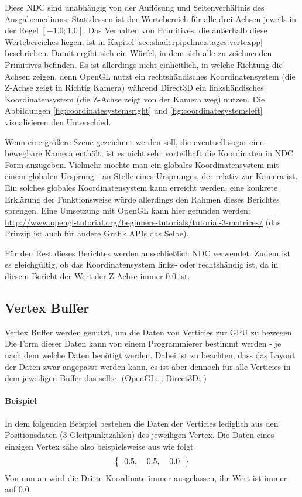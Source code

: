 Diese NDC sind unabhängig von der Auflösung und Seitenverhältnis des Ausgabemediums. Stattdessen ist der Wertebereich für alle drei Achsen jeweils in der Regel $[-1.0;1.0]$. Das Verhalten von Primitives, die außerhalb diese Wertebereiches liegen, ist in Kapitel \ref{sec:shaderpipeline:stages:vertexpp} beschrieben. Damit ergibt sich ein Würfel, in dem sich alle zu zeichnenden Primitives befinden. Es ist allerdings nicht einheitlich, in welche Richtung die Achsen zeigen, denn OpenGL nutzt ein rechtshändisches Koordinatensystem (die Z-Achse zeigt in Richtig Kamera) während Direct3D ein linkshändisches Koordinatensystem (die Z-Achse zeigt von der Kamera weg) nutzen. Die Abbildungen \ref{fig:coordinatesystemsright} und \ref{fig:coordinatesystemsleft} visualisieren den Unterschied.

Wenn eine größere Szene gezeichnet werden soll, die eventuell sogar eine bewegbare Kamera enthält, ist es nicht sehr vorteilhaft die Koordinaten in NDC Form anzugeben. Vielmehr möchte man ein globales Koordinatensystem mit einem globalen Ursprung - an Stelle eines Ursprunges, der relativ zur Kamera ist. Ein solches globales Koordinatensystem kann erreicht werden, eine konkrete Erklärung der Funktionsweise würde allerdings den Rahmen dieses Berichtes sprengen. Eine Umsetzung mit OpenGL kann hier gefunden werden: \url{http://www.opengl-tutorial.org/beginners-tutorials/tutorial-3-matrices/} (das Prinzip ist auch für andere Grafik APIs das Selbe).

Für den Rest dieses Berichtes werden ausschließlich NDC verwendet. Zudem ist es gleichgültig, ob das Koordinatensystem links- oder rechtshändig ist, da in diesem Bericht der Wert der Z-Achse immer $0.0$ ist.

\subsection{Vertex Buffer}
\label{sec:buffer:vertexbuffer}
Vertex Buffer werden genutzt, um die Daten von Verticies zur GPU zu bewegen. Die Form dieser Daten kann von einem Programmierer bestimmt werden - je nach dem welche Daten benötigt werden. Dabei ist zu beachten, dass das Layout der Daten zwar angepasst werden kann, es ist aber dennoch für alle Verticies in dem jeweiligen Buffer das selbe. (OpenGL: \cite{stage_gl_vertex_spec}; Direct3D: \cite{d3d_buffers})

\paragraph{Beispiel}
In dem folgenden Beispiel bestehen die Daten der Verticies lediglich aus den Positionsdaten (3 Gleitpunktzahlen) des jeweiligen Vertex. Die Daten eines einzigen Vertex sähe also beispielsweise aus wie folgt
$$
\left\{
\begin{tabular}{ccc}
    0.5, & 0.5, & 0.0
\end{tabular}
\right\}
$$
Von nun an wird die Dritte Koordinate immer ausgelassen, ihr Wert ist immer auf $0.0$.


